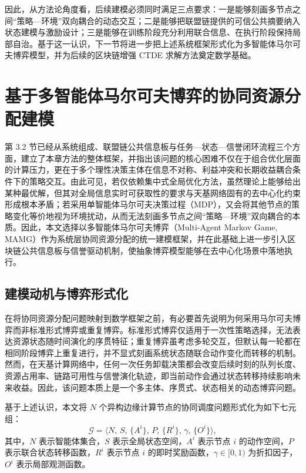 \documentclass[UTF8,12pt,oneside]{ctexbook}
\begin{document}
因此，从方法论角度看，后续建模必须同时满足三点要求：一是能够刻画多节点之间“策略—环境”双向耦合的动态交互；二是能够把联盟链提供的可信公共摘要纳入状态建模与激励设计；三是能够在训练阶段充分利用联合信息、在执行阶段保持局部自治。基于这一认识，下一节将进一步把上述系统框架形式化为多智能体马尔可夫博弈模型，并为后续的区块链增强 CTDE 求解方法奠定数学基础。

\section{基于多智能体马尔可夫博弈的协同资源分配建模}

第 3.2 节已经从系统组成、联盟链公共信息板与任务—状态—信誉闭环流程三个方面，建立了本章方法的整体框架，并指出该问题的核心困难不仅在于组合优化层面的计算压力，更在于多个理性决策主体在信息不对称、利益冲突和长期收益耦合条件下的策略交互。由此可见，若仅依赖集中式全局优化方法，虽然理论上能够给出某种最优解，但其对全局信息实时可获取性的要求与天基网络固有的去中心化约束形成根本矛盾；若采用单智能体马尔可夫决策过程（MDP），又会将其他节点的策略变化等价地视为环境扰动，从而无法刻画多节点之间“策略—环境”双向耦合的本质。因此，本文选择以多智能体马尔可夫博弈（Multi-Agent Markov Game, MAMG）作为系统层协同资源分配的统一建模框架，并在此基础上进一步引入区块链公共信息板与信誉驱动机制，使抽象博弈模型能够在去中心化场景中落地执行。

\subsection{建模动机与博弈形式化}

在将协同资源分配问题映射到数学框架之前，有必要首先说明为何采用马尔可夫博弈而非标准形式博弈或重复博弈。标准形式博弈仅适用于一次性策略选择，无法表达资源状态随时间演化的序贯特征；重复博弈虽考虑多轮交互，但默认每一轮都在相同阶段博弈上重复进行，并不显式刻画系统状态随联合动作变化而转移的机制。然而，在天基计算网络中，任何一次任务卸载决策都会改变后续时刻的队列长度、资源占用率、链路可用性与信誉演化轨迹，即当前动作会通过状态转移持续影响未来收益。因此，该问题本质上是一个多主体、序贯式、状态相关的动态博弈问题。

基于上述认识，本文将 $N$ 个异构边缘计算节点的协同调度问题形式化为如下七元组：
\begin{equation}
  \mathcal{G}=\langle N,\,S,\,\{A^i\},\,P,\,\{R^i\},\,\gamma,\,\{O^i\}\rangle,
  \label{eq:margov_game}
\end{equation}
其中，$N$ 表示智能体集合，$S$ 表示全局状态空间，$A^i$ 表示节点 $i$ 的动作空间，$P$ 表示联合状态转移函数，$R^i$ 表示节点 $i$ 的即时奖励函数，$\gamma\in[0,1)$ 为折扣因子，$O^i$ 表示局部观测函数。
\end{document}
